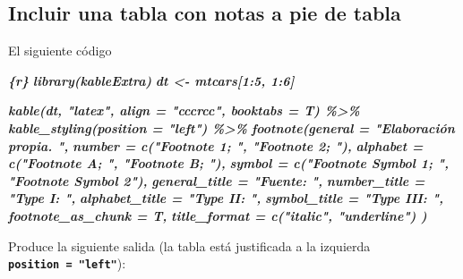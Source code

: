 \documentclass[12pt,a4paper,oneside,]{book}
\newenvironment{Shaded}{\begin{snugshade}}{\end{snugshade}}
\newcommand{\InformationTok}[1]{\textcolor[rgb]{0.56,0.35,0.01}{\textbf{\textit{#1}}}}
\numberwithin{dummy}{section}
\theoremstyle{ocrenumbox}
\theoremstyle{blacknumex}
\theoremstyle{blacknumbox}
\theoremstyle{ocrenum}
\theoremstyle{ocrenum}
\begin{document}
\hypertarget{incluir-una-tabla-con-notas-a-pie-de-tabla}{%
\subsection{Incluir una tabla con notas a pie de
tabla}\label{incluir-una-tabla-con-notas-a-pie-de-tabla}}

El siguiente código

\begin{Shaded}
\begin{Highlighting}[]
\InformationTok{\textasciigrave{}\textasciigrave{}\textasciigrave{}\{r\}}
\InformationTok{library(kableExtra)}
\InformationTok{dt \textless{}{-} mtcars[1:5, 1:6]}

\InformationTok{kable(dt, "latex", align = "cccrcc", booktabs = T) \%\textgreater{}\%}
\InformationTok{    kable\_styling(position = "left") \%\textgreater{}\% }
\InformationTok{    footnote(general = "Elaboración propia. ",}
\InformationTok{             number = c("Footnote 1; ", "Footnote 2; "),}
\InformationTok{             alphabet = c("Footnote A; ", "Footnote B; "),}
\InformationTok{             symbol = c("Footnote Symbol 1; ", "Footnote Symbol 2"), }
\InformationTok{             general\_title = "Fuente: ", }
\InformationTok{             number\_title = "Type I: ", }
\InformationTok{             alphabet\_title = "Type II: ", }
\InformationTok{             symbol\_title = "Type III: ", }
\InformationTok{             footnote\_as\_chunk = T, }
\InformationTok{             title\_format = c("italic", "underline") )}
\InformationTok{\textasciigrave{}\textasciigrave{}\textasciigrave{}}
\end{Highlighting}
\end{Shaded}

Produce la siguiente salida (la tabla está justificada a la izquierda
\textbf{\texttt{position\ =\ "left"}}):
\end{document}
